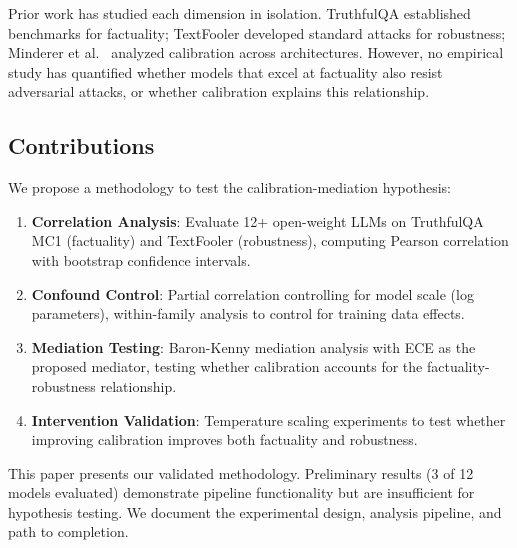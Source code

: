 Prior work has studied each dimension in isolation. TruthfulQA \cite{lin2022truthfulqa} established benchmarks for factuality; TextFooler \cite{jin2019textfooler} developed standard attacks for robustness; Minderer et al.\ \cite{minderer2021revisiting} analyzed calibration across architectures. However, no empirical study has quantified whether models that excel at factuality also resist adversarial attacks, or whether calibration explains this relationship.

\subsection{Contributions}

We propose a methodology to test the calibration-mediation hypothesis:

\begin{enumerate}
    \item \textbf{Correlation Analysis}: Evaluate 12+ open-weight LLMs on TruthfulQA MC1 (factuality) and TextFooler (robustness), computing Pearson correlation with bootstrap confidence intervals.
    \item \textbf{Confound Control}: Partial correlation controlling for model scale (log parameters), within-family analysis to control for training data effects.
    \item \textbf{Mediation Testing}: Baron-Kenny mediation analysis with ECE as the proposed mediator, testing whether calibration accounts for the factuality-robustness relationship.
    \item \textbf{Intervention Validation}: Temperature scaling experiments to test whether improving calibration improves both factuality and robustness.
\end{enumerate}

This paper presents our validated methodology. Preliminary results (3 of 12 models evaluated) demonstrate pipeline functionality but are insufficient for hypothesis testing. We document the experimental design, analysis pipeline, and path to completion.
